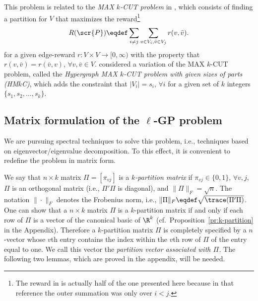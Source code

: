 \documentclass[10pt]{article}
\begin{document}
\medskip

This problem is related to the \emph{MAX $k$-CUT problem} in
\cite{FriezeJerrum97}, which consists of finding a partition for $V$
that maximizes the reward\footnote{The reward in
  \cite{FriezeJerrum97} is actually half of the one presented here
  because in that reference the outer summation was only over $i<j$.}
\begin{align*}
  R(\scr{P})\eqdef \sum_{i\neq j} \sum_{v\in V_i,\bar v\in V_j}r(v,\bar v).
\end{align*}
for a given edge-reward $r:V\times V\to[0,\infty)$ with the property that
$r(v,\bar v)=r(\bar v,v)$, $\forall v,\bar v\in V$.
\citet{AgeevSviridenkoDec99} considered a variation of the MAX $k$-CUT
problem, called the \emph{Hypergraph MAX $k$-CUT problem with given
  sizes of parts (HM$k$C)}, which adds the constraint that
$|V_i|=s_i$, $\forall i$ for a given set of $k$ integers
$\{s_1,s_2,\dots,s_k\}$.


\subsection{Matrix formulation of the $\ell$-GP problem}

We are pursuing spectral techniques to solve this problem, i.e.,
techniques based on eigenvector/eigenvalue decomposition. To this
effect, it is convenient to redefine the problem in matrix form.

\medskip

We say that $n\times k$ matrix $\Pi=[\pi_{v j}]$ is a \emph{$k$-partition
  matrix} if $\pi_{v j}\in\{0,1\}$, $\forall v,j$, $\Pi$ is an orthogonal matrix
(i.e., $\Pi'\Pi$ is diagonal), and $\|\Pi\|_F=\sqrt n$. The notation $\| \cdot \|_F$
denotes the Frobenius norm, i.e., $\|\Pi\|_F\eqdef\sqrt{\trace(\Pi' \Pi)}$.
One can show that a $n\times k$ matrix $\Pi$ is a $k$-partition matrix if and
only if each row of $\Pi$ is a vector of the canonical basic of $\R^k$
(cf.~Proposition~\ref{pr:k-partition} in the Appendix). Therefore a
$k$-partition matrix $\Pi$ is completely specified by a $n$-vector whose
$v$th entry contains the index within the $v$th row of $\Pi$ of the
entry equal to one. We call this vector the \emph{partition vector
  associated with $\Pi$.} The following two lemmas, which are proved in
the appendix, will be needed.
\end{document}
